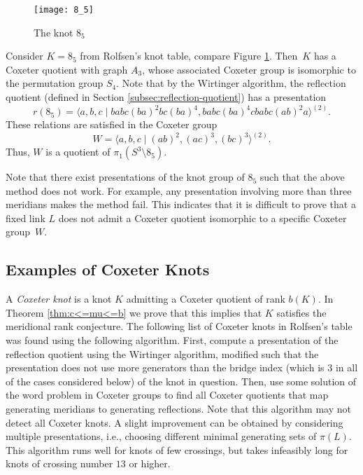 \documentclass[main.tex]{subfiles}
\begin{document}
\begin{figure}[ht]
\centering
\texttt{[image: 8\_5]}
\caption{The knot $8_5$}
\label{fig:8-5}
\end{figure}

\begin{example}
Consider $K = 8_5$ from Rolfsen's knot table, compare Figure \ref{fig:8-5}. Then~$K$ has a Coxeter quotient with graph $A_3$, whose associated Coxeter group is isomorphic to the permutation group $S_4$.
Note that by the Wirtinger algorithm, the reflection quotient (defined in Section \ref{subsec:reflection-quotient}) has a presentation
$$r(8_5) = \langle a, b, c\; | \; babc(ba)^2bc(ba)^4, babc(ba)^4cbabc(ab)^2a \rangle^{(2)}.$$
These relations are satisfied in the Coxeter group
$$W = \langle a, b, c \; | \; (ab)^2, (ac)^3, (bc)^3 \rangle^{(2)}.$$
Thus, $W$ is a quotient of $\pi_1(S^3 \setminus 8_5)$.
\end{example}

Note that there exist presentations of the knot group of $8_5$  such that the above method does not work. For example, any presentation involving more than three meridians makes the method fail. This indicates that it is difficult to prove that a fixed link $L$ does not admit a Coxeter quotient isomorphic to a specific Coxeter group~$W$.

\subsection{Examples of Coxeter Knots}\label{subsec:list-of-quotients}
A \textit{Coxeter knot} is a knot $K$ admitting a Coxeter quotient of rank $b(K)$. In Theorem \ref{thm:c<=mu<=b} we prove that this implies that $K$ satisfies the meridional rank conjecture.
The following list of Coxeter knots in Rolfsen's table \cite{rolfsen2003} was found using the following algorithm. First, compute a presentation of the reflection quotient using the Wirtinger algorithm, modified such that the presentation does not use more generators than the bridge index (which is $3$ in all of the cases considered below) of the knot in question. Then, use some solution of the word problem in Coxeter groups to find all Coxeter quotients that map generating meridians to generating reflections. Note that this algorithm may not detect all Coxeter knots. A slight improvement can be obtained by considering multiple presentations, i.e., choosing different minimal generating sets of $\pi(L)$. This algorithm runs well for knots of few crossings, but takes infeasibly long for knots of crossing number $13$ or higher.
\end{document}
